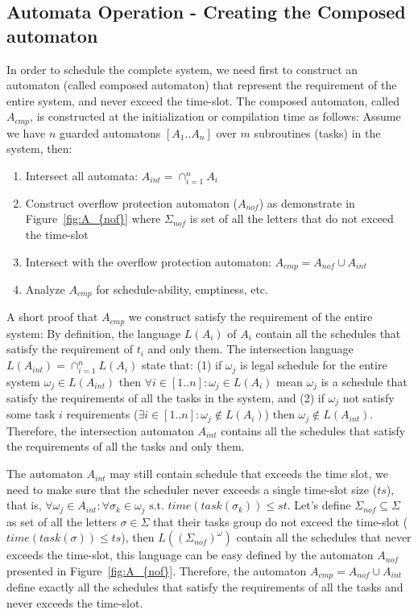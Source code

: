 \documentclass[ twoside, 12pt ]{article}
\begin{document}
{\subsection{Automata Operation - Creating the Composed automaton }

In order to schedule the complete system, we need first to construct an automaton (called composed automaton) that represent the requirement of the entire system, and never exceed the time-slot.
The composed automaton, called $A_{cmp}$, is constructed at the initialization or compilation time as follows:
Assume we have $n$ guarded automatons $[A_1 .. A_n]$ over $m$ subroutines (tasks) in the system, then:
\begin{enumerate}
    \item Intersect all automata: $A_{int}= \cap_{i=1}^{n} A_i$
    \item Construct overflow protection automaton ($A_{nof}$) as demonstrate in Figure~\ref{fig:A_{nof}} where $\Sigma_{nof}$ is set of all the letters that do not exceed the time-slot
    \item Intersect with the overflow protection automaton: $A_{cmp} =  A_{nof} \cup A_{int}$
    \item Analyze $A_{cmp}$ for schedule-ability, emptiness, etc.
\end{enumerate}

A short proof that $A_{cmp}$ we construct satisfy the requirement of the entire system:
By definition, the language $L(A_i)$ of $A_i$ contain all the schedules that satisfy the requirement of $t_i$ and only them.
The intersection language $L(A_{int})= \cap_{i=1}^{n} L(A_i) $ state that: 
(1) if $\omega_j$ is legal schedule for the entire system $\omega_j \in L(A_{int})$ then $\forall i \in [1..n] : \omega_j \in L(A_i)$ mean $\omega_j$ is a schedule that satisfy the requirements of all the tasks in the system,
and (2) if $\omega_j$ not satisfy some task $i$ requirements ($\exists i \in [1..n] : \omega_j \notin L(A_i) $) then $\omega_j \notin L(A_{int})$. 
Therefore, the intersection automaton $A_{int}$ contains all the schedules that satisfy the requirements of all the tasks and only them.

The automaton $A_{int}$ may still contain schedule that exceeds the time slot, we need to make sure that the scheduler never exceeds a single time-slot size ($ts$), that is, $\forall \omega_j \in A_{int} : \forall \sigma_k \in \omega_j \text{~s.t.~} time( task(\sigma_k)) \le st $.
Let's define $\Sigma_{nof} \subseteq \Sigma$ as set of all the letters $\sigma \in \Sigma$ that their tasks group do not exceed the time-slot ($time( task(\sigma)) \le ts$), then $L((\Sigma_{nof})^\omega)$ contain all the schedules that never exceeds the time-slot, this language can be easy defined by the automaton $A_{nof}$ presented in Figure~\ref{fig:A_{nof}}. 
Therefore, the automaton $A_{cmp} =  A_{nof} \cup A_{int}$ define exactly all the schedules that satisfy the requirements of all the tasks and never exceeds the time-slot.

}
\end{document}
